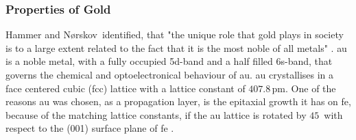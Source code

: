\documentclass[a4paper,12pt,twoside]{article}
\begin{document}
\subsubsection{Properties of Gold}
                \label{CPGchap}
Hammer and N\o rskov\, identified, that "the unique role that gold plays in society is to a large extent related to the fact that it is the most noble of all metals" \cite{Nature1995}. \gls{au} is a noble metal, with a fully occupied 5d-band and a half filled 6s-band, that governs the chemical and optoelectronical behaviour of \gls{au}. \gls{au} crystallises in a face centered cubic (fcc) lattice with a lattice constant of $407.8\,\mathrm{\mbox{pm}}$. One of the reasons \gls{au} was chosen, as a propagation layer, is the epitaxial growth it has on \gls{fe}, because of the matching lattice constants, if the \gls{au} lattice is rotated by $45$\textdegree\, with respect to the (001) surface plane of \gls{fe} \cite{tilley2006crystals}.
\end{document}
